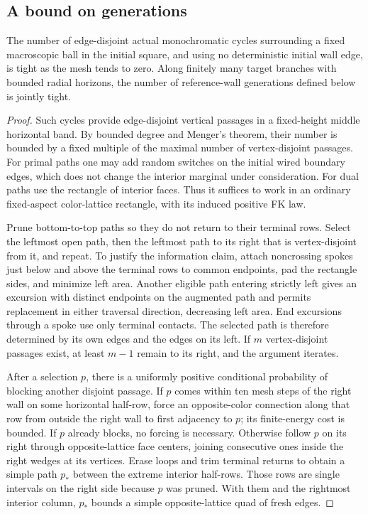 \subsection{A bound on generations}
\label{peel:generations}

\begin{lemma}
\label{peel:passages}
The number of edge-disjoint actual monochromatic cycles surrounding a
fixed macroscopic ball in the initial square, and using no deterministic
initial wall edge, is tight as the mesh tends to zero.  Along finitely
many target branches with bounded radial horizons, the number of
reference-wall generations defined below is jointly tight.
\end{lemma}

\begin{proof}
Such cycles provide edge-disjoint vertical passages in a fixed-height
middle horizontal band.  By bounded degree and Menger's theorem,
their number is bounded by a fixed multiple of the maximal number of
vertex-disjoint passages.  For primal paths one may add random switches
on the initial wired boundary edges, which does not change the interior
marginal under consideration.  For dual paths use the rectangle of
interior faces.  Thus it suffices to work in an ordinary fixed-aspect
color-lattice rectangle, with its induced positive FK law.

Prune bottom-to-top paths so they do not return to their terminal rows.
Select the leftmost open path, then the leftmost path to its right that
is vertex-disjoint from it, and repeat.  To justify the information
claim, attach noncrossing spokes just below and above the terminal rows
to common endpoints, pad the rectangle sides, and minimize left area.
Another eligible path entering strictly left gives an excursion with
distinct endpoints on the augmented path and permits replacement in
either traversal direction, decreasing left area.  End excursions
through a spoke use only terminal contacts.  The selected path is
therefore determined by its own edges and the edges on its left.  If
$m$ vertex-disjoint passages exist, at least $m-1$ remain to its right,
and the argument iterates.

After a selection $p$, there is a uniformly positive conditional
probability of blocking another disjoint passage.  If $p$ comes within
ten mesh steps of the right wall on some horizontal half-row, force an
opposite-color connection along that row from outside the right wall
to first adjacency to $p$; its finite-energy cost is bounded.  If $p$
already blocks, no forcing is necessary.  Otherwise follow $p$ on its
right through opposite-lattice face centers, joining consecutive ones
inside the right wedges at its vertices.  Erase loops and trim terminal
returns to obtain a simple path $p_*$ between the extreme interior
half-rows.  Those rows are single intervals on the right side because
$p$ was pruned.  With them and the rightmost interior column, $p_*$
bounds a simple opposite-lattice quad of fresh edges.


\end{proof}
